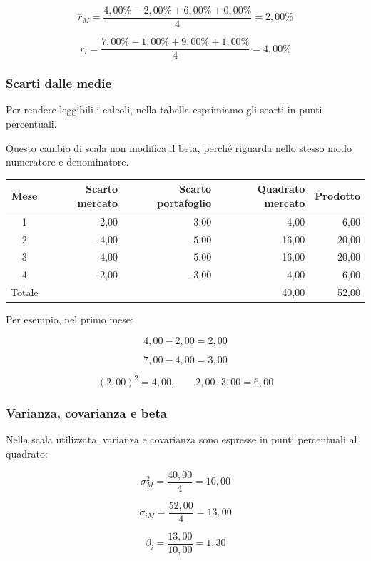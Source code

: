 \[
    \overline r_M
    =
    \frac{4{,}00\%-2{,}00\%+6{,}00\%+0{,}00\%}{4}
    =
    2{,}00\%
\]

\[
    \overline r_i
    =
    \frac{7{,}00\%-1{,}00\%+9{,}00\%+1{,}00\%}{4}
    =
    4{,}00\%
\]

\subsubsection*{Scarti dalle medie}

Per rendere leggibili i calcoli, nella tabella esprimiamo
gli scarti in punti percentuali.

\noindent Questo cambio di scala non modifica il beta,
perché riguarda nello stesso modo numeratore e denominatore.

\begin{center}
    \begin{tabular}{crrrr}
        \hline
        Mese & Scarto mercato & Scarto portafoglio
        & Quadrato mercato & Prodotto \\
        \hline
        1 & 2,00 & 3,00 & 4,00 & 6,00 \\
        2 & -4,00 & -5,00 & 16,00 & 20,00 \\
        3 & 4,00 & 5,00 & 16,00 & 20,00 \\
        4 & -2,00 & -3,00 & 4,00 & 6,00 \\
        \hline
        Totale & & & 40,00 & 52,00 \\
        \hline
    \end{tabular}
\end{center}

\noindent Per esempio, nel primo mese:

\[
    4{,}00-2{,}00=2{,}00
\]

\[
    7{,}00-4{,}00=3{,}00
\]

\[
    (2{,}00)^2=4{,}00,
    \qquad
    2{,}00\cdot3{,}00=6{,}00
\]

\subsubsection*{Varianza, covarianza e beta}

Nella scala utilizzata, varianza e covarianza
sono espresse in punti percentuali al quadrato:

\[
    \sigma_M^2=\frac{40{,}00}{4}=10{,}00
\]

\[
    \sigma_{iM}=\frac{52{,}00}{4}=13{,}00
\]

\[
    \beta_i=\frac{13{,}00}{10{,}00}=1{,}30
\]

